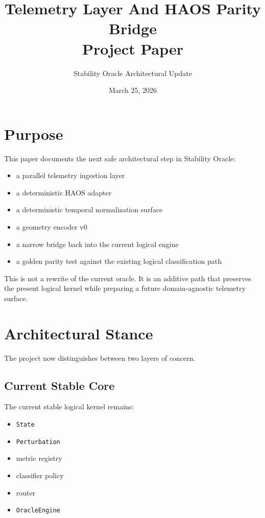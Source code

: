 \documentclass[11pt]{article}
\title{Telemetry Layer And HAOS Parity Bridge\\Project Paper}
\author{Stability Oracle Architectural Update}
\date{March 25, 2026}
\begin{document}
\maketitle
\tableofcontents
\newpage

\section{Purpose}

This paper documents the next safe architectural step in Stability Oracle:

\begin{itemize}
\item a parallel telemetry ingestion layer
\item a deterministic HAOS adapter
\item a deterministic temporal normalization surface
\item a geometry encoder v0
\item a narrow bridge back into the current logical engine
\item a golden parity test against the existing logical classification path
\end{itemize}

This is not a rewrite of the current oracle.
It is an additive path that preserves the present logical kernel while preparing a future domain-agnostic telemetry surface.

\section{Architectural Stance}

The project now distinguishes between two layers of concern.

\subsection{Current Stable Core}

The current stable logical kernel remains:

\begin{itemize}
\item \texttt{State}
\item \texttt{Perturbation}
\item metric registry
\item classifier policy
\item router
\item \texttt{OracleEngine}
\end{itemize}
\end{document}
